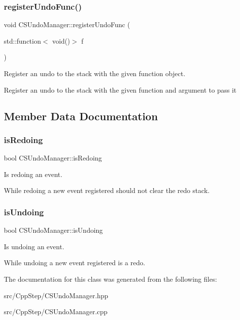 \subsubsection{\texorpdfstring{register\+Undo\+Func()}{registerUndoFunc()}}
{\footnotesize\ttfamily void C\+S\+Undo\+Manager\+::register\+Undo\+Func (\begin{DoxyParamCaption}\item[{std\+::function$<$ void()$>$}]{f }\end{DoxyParamCaption})}



Register an undo to the stack with the given function object. 

Register an undo to the stack with the given function and argument to pass it 

\subsection{Member Data Documentation}
\mbox{\label{classCSUndoManager_ad1087a3d4480bba871ac58935f4efd95}} 
\subsubsection{\texorpdfstring{is\+Redoing}{isRedoing}}
{\footnotesize\ttfamily bool C\+S\+Undo\+Manager\+::is\+Redoing\hspace{0.3cm}{\ttfamily [private]}}



Is redoing an event. 

While redoing a new event registered should not clear the redo stack. \mbox{\label{classCSUndoManager_ace8ec35440a0d96267d659135dcf0c39}} 
\subsubsection{\texorpdfstring{is\+Undoing}{isUndoing}}
{\footnotesize\ttfamily bool C\+S\+Undo\+Manager\+::is\+Undoing\hspace{0.3cm}{\ttfamily [private]}}



Is undoing an event. 

While undoing a new event registered is a redo. 

The documentation for this class was generated from the following files\+:\begin{DoxyCompactItemize}
\item 
src/\+Cpp\+Step/C\+S\+Undo\+Manager.\+hpp\item 
src/\+Cpp\+Step/C\+S\+Undo\+Manager.\+cpp\end{DoxyCompactItemize}
